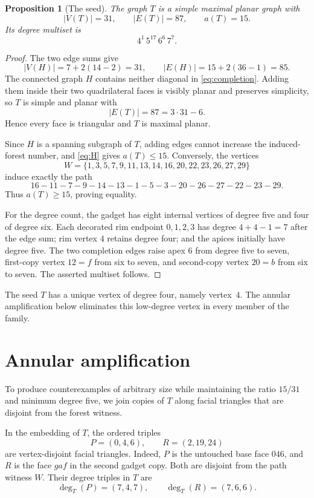 \documentclass[11pt]{article}
\newtheorem{proposition}[theorem]{Proposition}
\theoremstyle{definition}
\theoremstyle{remark}
\begin{document}
\begin{proposition}[The seed]\label{prop:seed}
The graph $T$ is a simple maximal planar graph with
\[
 |V(T)|=31,
 \qquad
 |E(T)|=87,
 \qquad
 a(T)=15.
\]
Its degree multiset is
\[
 4^1\,5^{17}\,6^6\,7^7.
\]
\end{proposition}

\begin{proof}
The two edge sums give
\[
 |V(H)|=7+2(14-2)=31,
 \qquad
 |E(H)|=15+2(36-1)=85.
\]
 The connected graph $H$ contains neither diagonal in \eqref{eq:completion}.
 Adding them inside their two quadrilateral faces is visibly planar and
 preserves simplicity, so $T$ is simple and planar with
\[
 |E(T)|=87=3\cdot31-6.
\]
Hence every face is triangular and $T$ is maximal planar.

Since $H$ is a spanning subgraph of $T$, adding edges cannot increase the
induced-forest number, and \eqref{eq:H} gives $a(T)\le15$.  Conversely, the
vertices
\[
 W=\{1,3,5,7,9,11,13,14,16,20,22,23,26,27,29\}
\]
induce exactly the path
\[
 16-11-7-9-14-13-1-5-3-20-26-27-22-23-29.
\]
Thus $a(T)\ge15$, proving equality.

For the degree count, the gadget has eight internal vertices of degree five
and four of degree six.  Each decorated rim endpoint $0,1,2,3$ has degree
$4+4-1=7$ after the edge sum; rim vertex $4$ retains degree four; and the
apices initially have degree five.  The two completion edges raise apex $6$
from degree five to seven, first-copy vertex $12=f$ from six to seven, and
second-copy vertex $20=b$ from six to seven.  The asserted multiset follows.
\end{proof}

The seed $T$ has a unique vertex of degree four, namely vertex~$4$.
The annular amplification below eliminates this low-degree vertex in
every member of the family.

\section{Annular amplification}

To produce counterexamples of arbitrary size while maintaining the ratio
$15/31$ and minimum degree five, we join copies of $T$ along facial
triangles that are disjoint from the forest witness.

In the embedding of $T$, the ordered triples
\begin{equation}\label{eq:ports}
 P=(0,4,6),
 \qquad
 R=(2,19,24)
\end{equation}
are vertex-disjoint facial triangles.  Indeed, $P$ is the untouched base
face $046$, and $R$ is the face $gaf$ in the second gadget copy.  Both are
disjoint from the path witness $W$.  Their degree triples in $T$ are
\begin{equation}\label{eq:portdegrees}
 \deg_T(P)=(7,4,7),
 \qquad
 \deg_T(R)=(7,6,6).
\end{equation}
\end{document}
